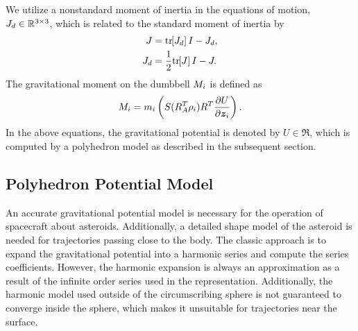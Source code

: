 \documentclass[journal]{new-aiaa}
\begin{document}
We utilize a nonstandard moment of inertia in the equations of motion, \( J_d \in \mathbb{R}^{3 \times 3 } \), which is related to the standard moment of inertia by
\begin{subequations}\label{eq:moi_transformation}
    \begin{align}
        J &= \mathrm{tr}\negthickspace\left[ J_d \right] I - J_d, \label{eq:moi_ns2s}\\
        J_d &= \frac{1}{2} \mathrm{tr}\negthickspace\left[ J \right] I - J.\label{eq:moi_s2ns}
    \end{align}
\end{subequations}     
The gravitational moment on the dumbbell \( M_i\) is defined as
\begin{align}
    M_i = m_i \left( S(R_A^T \rho_i) R^T \frac{\partial U}{\partial \bm{z}_i} \right).
\end{align}
In the above equations, the gravitational potential is denoted by $U\in\Re$, which is computed by a polyhedron model as described in the subsequent section. 



\subsection{Polyhedron Potential Model}\label{sec:polyhedron_potential}

An accurate gravitational potential model is necessary for the operation of spacecraft about asteroids.
Additionally, a detailed shape model of the asteroid is needed for trajectories passing close to the body.
The classic approach is to expand the gravitational potential into a harmonic series and compute the series coefficients.
However, the harmonic expansion is always an approximation as a result of the infinite order series used in the representation.
Additionally, the harmonic model used outside of the circumscribing sphere is not guaranteed to converge inside the sphere, which makes it unsuitable for trajectories near the surface.
\end{document}
